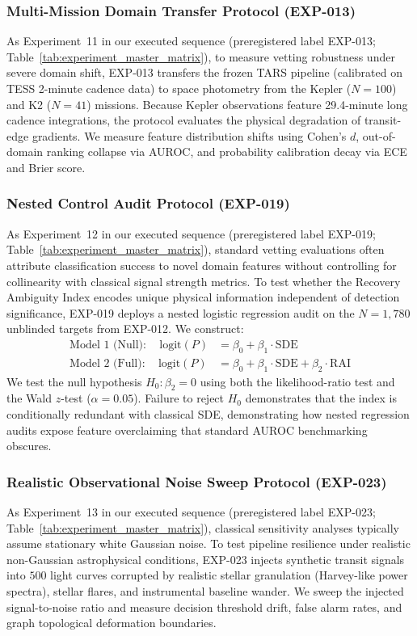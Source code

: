 \subsubsection{Multi-Mission Domain Transfer Protocol (EXP-013)} \label{sec:method_exp013_protocol}
As Experiment~11 in our executed sequence (preregistered label EXP-013; Table~\ref{tab:experiment_master_matrix}), to measure vetting robustness under severe domain shift, EXP-013 transfers the frozen TARS pipeline (calibrated on TESS 2-minute cadence data) to space photometry from the Kepler ($N=100$) and K2 ($N=41$) missions. Because Kepler observations feature 29.4-minute long cadence integrations, the protocol evaluates the physical degradation of transit-edge gradients. We measure feature distribution shifts using Cohen's $d$, out-of-domain ranking collapse via AUROC, and probability calibration decay via ECE and Brier score.

\subsubsection{Nested Control Audit Protocol (EXP-019)} \label{sec:method_exp019_protocol}
As Experiment~12 in our executed sequence (preregistered label EXP-019; Table~\ref{tab:experiment_master_matrix}), standard vetting evaluations often attribute classification success to novel domain features without controlling for collinearity with classical signal strength metrics. To test whether the Recovery Ambiguity Index encodes unique physical information independent of detection significance, EXP-019 deploys a nested logistic regression audit on the $N = 1{,}780$ unblinded targets from EXP-012. We construct:
\begin{align}
\text{Model 1 (Null)}: \quad \text{logit}(P) &= \beta_0 + \beta_1 \cdot \text{SDE} \\
\text{Model 2 (Full)}: \quad \text{logit}(P) &= \beta_0 + \beta_1 \cdot \text{SDE} + \beta_2 \cdot \text{RAI}
\end{align}
We test the null hypothesis $H_0: \beta_2 = 0$ using both the likelihood-ratio test and the Wald $z$-test ($\alpha = 0.05$). Failure to reject $H_0$ demonstrates that the index is conditionally redundant with classical SDE, demonstrating how nested regression audits expose feature overclaiming that standard AUROC benchmarking obscures.

\subsubsection{Realistic Observational Noise Sweep Protocol (EXP-023)} \label{sec:method_exp023_protocol}
As Experiment~13 in our executed sequence (preregistered label EXP-023; Table~\ref{tab:experiment_master_matrix}), classical sensitivity analyses typically assume stationary white Gaussian noise. To test pipeline resilience under realistic non-Gaussian astrophysical conditions, EXP-023 injects synthetic transit signals into $500$ light curves corrupted by realistic stellar granulation (Harvey-like power spectra), stellar flares, and instrumental baseline wander. We sweep the injected signal-to-noise ratio and measure decision threshold drift, false alarm rates, and graph topological deformation boundaries.

